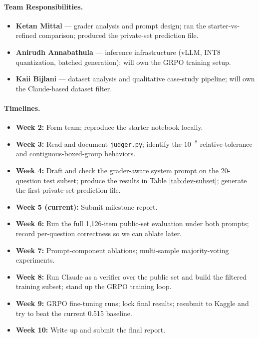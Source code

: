 \documentclass{article}
\begin{document}
\paragraph{Team Responsibilities.}
\begin{itemize}
    \item \textbf{Ketan Mittal} --- grader analysis and prompt
    design; ran the starter-vs-refined comparison; produced the
    private-set prediction file.
    \item \textbf{Anirudh Annabathula} --- inference infrastructure
    (vLLM, INT8 quantization, batched generation); will own the
    GRPO training setup.
    \item \textbf{Kaii Bijlani} --- dataset analysis and qualitative
    case-study pipeline; will own the Claude-based dataset filter.
\end{itemize}

\paragraph{Timelines.}
\begin{itemize}
    \item \textbf{Week 2:} Form team; reproduce the starter notebook
    locally.
    \item \textbf{Week 3:} Read and document \texttt{judger.py};
    identify the $10^{-8}$ relative-tolerance and
    contiguous-boxed-group behaviors.
    \item \textbf{Week 4:} Draft and check the grader-aware system
    prompt on the 20-question test subset; produce the results in
    Table \ref{tab:dev-subset}; generate the first private-set
    prediction file.
    \item \textbf{Week 5 (current):} Submit milestone report.
    \item \textbf{Week 6:} Run the full 1{,}126-item public-set
    evaluation under both prompts; record per-question correctness
    so we can ablate later.
    \item \textbf{Week 7:} Prompt-component ablations; multi-sample
    majority-voting experiments.
    \item \textbf{Week 8:} Run Claude as a verifier over the public
    set and build the filtered training subset; stand up the GRPO
    training loop.
    \item \textbf{Week 9:} GRPO fine-tuning runs; lock final
    results; resubmit to Kaggle and try to beat the current 0.515
    baseline.
    \item \textbf{Week 10:} Write up and submit the final report.
\end{itemize}
\end{document}
